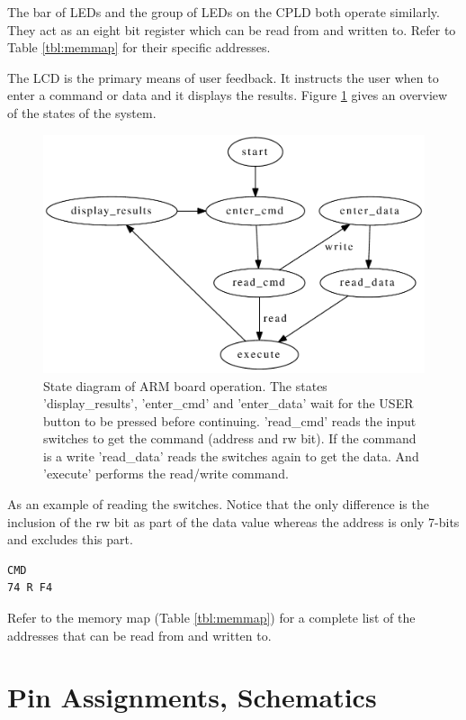 \documentclass{article}
\begin{document}
The bar of LEDs and the group of LEDs on the CPLD both operate
similarly.
They act as an eight bit register which can be read from and written to.
Refer to Table \ref{tbl:memmap} for their specific addresses.

The LCD is the primary means of user feedback.
It instructs the user when to enter a command or data and
it displays the results.
Figure \ref{fig:armstate} gives an overview of the states of
the system.

\begin{figure}[hbp]
\center
\includegraphics[scale=0.8]{figures/arm-state_diagram/arm-state_diagram}
\caption{State diagram of ARM board operation.
The states 'display\_results', 'enter\_cmd' and 'enter\_data'
wait for the USER button to be pressed before continuing.
'read\_cmd' reads the input switches to get the command (address and rw bit).
If the command is a write 'read\_data' reads the switches again to get the data.
And 'execute' performs the read/write command.
}
\label{fig:armstate}
\end{figure}

As an example of reading the switches.
Notice that the only difference is the inclusion of the
rw bit as part of the data value whereas the address
is only 7-bits and excludes this part.
\begin{verbatim}
CMD
74 R F4
\end{verbatim}

Refer to the memory map (Table \ref{tbl:memmap}) for
a complete list of the addresses that can be read from and written
to.


\section{Pin Assignments, Schematics}
\label{sec:pa}
\end{document}

